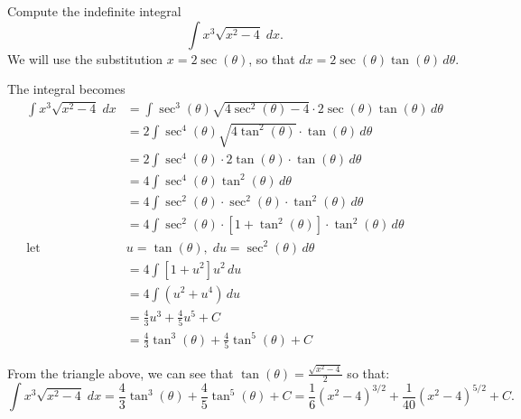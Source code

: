 \documentclass{ximera}
\begin{document}
\begin{example}
Compute the indefinite integral
\[
\int x^3\sqrt{x^2-4} \; dx.
\]
We will use the substitution $x = 2\sec(\theta)$,
so that $dx = 2\sec(\theta)\tan(\theta) \, d\theta$.

The integral becomes
\begin{align*}
\int x^3\sqrt{x^2-4}\; dx &= \int \sec^3(\theta)\sqrt{4\sec^2(\theta)-4}\cdot 2\sec(\theta)\tan(\theta)\, d\theta\\
                           &=  2\int \sec^4(\theta)\sqrt{4\tan^2(\theta)}\cdot \tan(\theta)\, d\theta\\   
                            &=  2\int \sec^4(\theta)\cdot2\tan(\theta)\cdot \tan(\theta)\, d\theta\\ 
                            &=  4\int \sec^4(\theta)\tan^2(\theta)\, d\theta\\ 
                            &=  4\int \sec^2(\theta)\cdot \sec^2(\theta) \cdot \tan^2(\theta)\, d\theta\\  
                            &=  4\int \sec^2(\theta)\cdot [1 + \tan^2(\theta)] \cdot \tan^2(\theta)\, d\theta\\  
                            \text{let } \; & u = \tan(\theta), \; du = \sec^2(\theta) \, d\theta\\
                            &=  4\int [1 + u^2]u^2\, du\\ 
                             &=  4\int (u^2 + u^4) \, du\\ 
                             &= \frac43 u^3 + \frac45 u^5 + C\\
                             &= \frac43 \tan^3(\theta) + \frac45 \tan^5(\theta) + C                            
\end{align*}


From the triangle above, we can see that $\tan(\theta) = \frac{\sqrt{x^2-4}}{2}$ so that:
\[
\int x^3\sqrt{x^2-4} \; dx =  \frac43 \tan^3(\theta) + \frac45 \tan^5(\theta) + C =  \frac16 (x^2 - 4)^{3/2} + 
\frac{1}{40} (x^2 - 4)^{5/2} + C.
\]

\end{example}
\end{document}
